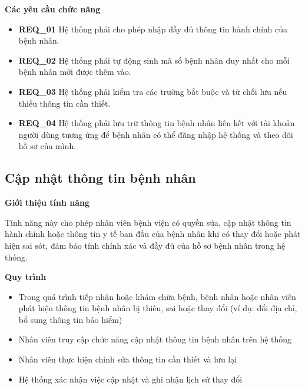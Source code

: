 \noindent \textbf{Các yêu cầu chức năng}

\begin{itemize}

  \item \textbf{REQ\_01} Hệ thống phải cho phép nhập đầy đủ thông tin hành chính của bệnh nhân.

  \item \textbf{REQ\_02} Hệ thống phải tự động sinh mã số bệnh nhân duy nhất cho mỗi bệnh nhân mới được thêm vào.

  \item \textbf{REQ\_03} Hệ thống phải kiểm tra các trường bắt buộc và từ chối lưu nếu thiếu thông tin cần thiết.

  \item \textbf{REQ\_04} Hệ thống phải lưu trữ thông tin bệnh nhân liên kết với tài khoản người dùng tương ứng để bệnh nhân có thể đăng nhập hệ thống và theo dõi hồ sơ của mình.

\end{itemize}

\subsection{Cập nhật thông tin bệnh nhân}

\noindent \textbf{Giới thiệu tính năng}

Tính năng này cho phép nhân viên bệnh viện có quyền sửa, cập nhật thông tin hành chính hoặc thông tin y tế ban đầu của bệnh nhân khi có thay đổi hoặc phát hiện sai sót, đảm bảo tính chính xác và đầy đủ của hồ sơ bệnh nhân trong hệ thống.

\noindent \textbf{Quy trình}

\begin{itemize}

  \item Trong quá trình tiếp nhận hoặc khám chữa bệnh, bệnh nhân hoặc nhân viên phát hiện thông tin bệnh nhân bị thiếu, sai hoặc thay đổi (ví dụ: đổi địa chỉ, bổ sung thông tin bảo hiểm)

  \item Nhân viên truy cập chức năng cập nhật thông tin bệnh nhân trên hệ thống

  \item Nhân viên thực hiện chỉnh sửa thông tin cần thiết và lưu lại

  \item Hệ thống xác nhận việc cập nhật và ghi nhận lịch sử thay đổi

\end{itemize}

